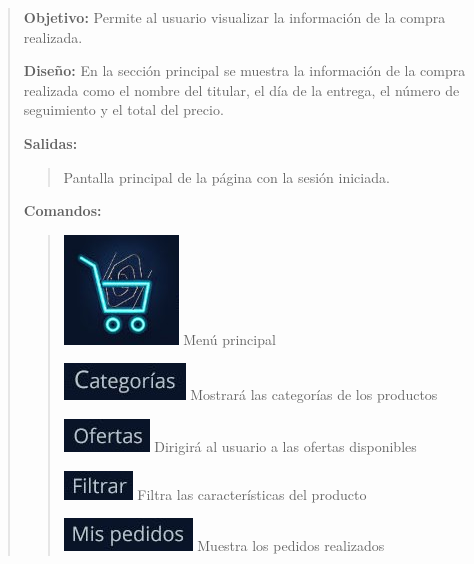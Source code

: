\documentclass[14pt]{article}
\begin{document}
                \begin{quote}
                    \textbf{Objetivo:} Permite al usuario visualizar la información de la compra realizada.
                    
                    \textbf{Diseño:} En la sección principal se muestra la información de la compra realizada como el nombre del titular, el día de la entrega, el número de seguimiento y el total del precio.
                    
                    \textbf{Salidas:}
                        \begin{quote}
                            Pantalla principal de la página con la sesión iniciada.
                        \end{quote}
                        
                    \textbf{Comandos:}
                        \begin{quote}
                            \includegraphics[height=0.02\textwidth]{BotonMenuPrincipal.jpg}
                            \label{P9:BotonMenuPrincipal} Menú principal
                            
                            \includegraphics[height=0.02\textwidth]{BotonCategorias.jpg}
                            \label{P9:BotonCategorias} Mostrará las categorías de los productos
                           
                            \includegraphics[height=0.02\textwidth]{BotonOfertas.jpg}
                            \label{P9:BotonOfertas} Dirigirá al usuario a las ofertas disponibles
                            
                            \includegraphics[height=0.02\textwidth]{BotonFiltrar.jpg}
                            \label{P9:BotonFiltrar} Filtra las características del producto
                            
                            \includegraphics[height=0.02\textwidth]{BotonMisPedidos.jpg}
                            \label{P9:BotonMisPedidos} Muestra los pedidos realizados
                           

\end{quote}
\end{quote}
\end{document}
